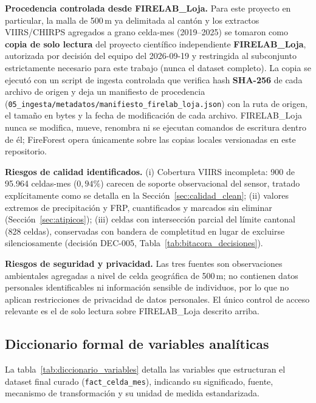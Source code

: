 \documentclass[11pt,a4paper]{article}
\begin{document}
\textbf{Procedencia controlada desde FIRELAB\_Loja.} Para este proyecto en particular, la malla de 500\,m ya delimitada al cant\'on y los extractos VIIRS/CHIRPS agregados a grano celda-mes (2019--2025) se tomaron como \textbf{copia de solo lectura} del proyecto cient\'ifico independiente \textbf{FIRELAB\_Loja}, autorizada por decisi\'on del equipo del 2026-09-19 y restringida al subconjunto estrictamente necesario para este trabajo (nunca el dataset completo). La copia se ejecut\'o con un script de ingesta controlada que verifica hash \textbf{SHA-256} de cada archivo de origen y deja un manifiesto de procedencia (\texttt{05\_ingesta/metadatos/manifiesto\_firelab\_loja.json}) con la ruta de origen, el tama\~no en bytes y la fecha de modificaci\'on de cada archivo. FIRELAB\_Loja nunca se modifica, mueve, renombra ni se ejecutan comandos de escritura dentro de \'el; FireForest opera \'unicamente sobre las copias locales versionadas en este repositorio.

\textbf{Riesgos de calidad identificados.} (i) Cobertura VIIRS incompleta: 900 de 95.964 celdas-mes ($0{,}94\%$) carecen de soporte observacional del sensor, tratado expl\'icitamente como se detalla en la Secci\'on~\ref{sec:calidad_clean}; (ii) valores extremos de precipitaci\'on y FRP, cuantificados y marcados sin eliminar (Secci\'on~\ref{sec:atipicos}); (iii) celdas con intersecci\'on parcial del l\'imite cantonal (828 celdas), conservadas con bandera de completitud en lugar de excluirse silenciosamente (decisi\'on DEC-005, Tabla~\ref{tab:bitacora_decisiones}).

\textbf{Riesgos de seguridad y privacidad.} Las tres fuentes son observaciones ambientales agregadas a nivel de celda geogr\'afica de 500\,m; no contienen datos personales identificables ni informaci\'on sensible de individuos, por lo que no aplican restricciones de privacidad de datos personales. El \'unico control de acceso relevante es el de solo lectura sobre FIRELAB\_Loja descrito arriba.

\subsection{Diccionario formal de variables anal\'iticas}
La tabla~\ref{tab:diccionario_variables} detalla las variables que estructuran el dataset final curado (\texttt{fact\_celda\_mes}), indicando su significado, fuente, mecanismo de transformaci\'on y su unidad de medida estandarizada.
\end{document}
